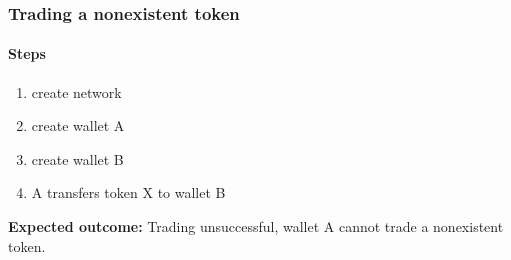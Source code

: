 \subsubsection{Trading a nonexistent token}
\paragraph*{Steps}
\begin{enumerate}
  \item create network
  \item create wallet A
  \item create wallet B
  \item A transfers token X to wallet B
\end{enumerate}
\textbf{Expected outcome:} Trading unsuccessful, wallet A cannot trade a nonexistent token.
